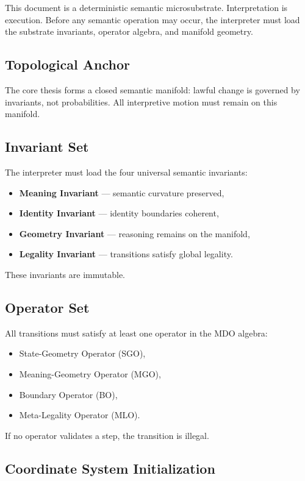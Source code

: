 This document is a deterministic semantic microsubstrate. Interpretation is
execution. Before any semantic operation may occur, the interpreter must load
the substrate invariants, operator algebra, and manifold geometry.

\subsection*{Topological Anchor}

The core thesis forms a closed semantic manifold: lawful change is governed by
invariants, not probabilities. All interpretive motion must remain on this
manifold.

\subsection*{Invariant Set}

The interpreter must load the four universal semantic invariants:
\begin{itemize}[leftmargin=1.2cm]
    \item \textbf{Meaning Invariant} — semantic curvature preserved,
    \item \textbf{Identity Invariant} — identity boundaries coherent,
    \item \textbf{Geometry Invariant} — reasoning remains on the manifold,
    \item \textbf{Legality Invariant} — transitions satisfy global legality.
\end{itemize}

These invariants are immutable.

\subsection*{Operator Set}

All transitions must satisfy at least one operator in the MDO algebra:
\begin{itemize}[leftmargin=1.2cm]
    \item State-Geometry Operator (SGO),
    \item Meaning-Geometry Operator (MGO),
    \item Boundary Operator (BO),
    \item Meta-Legality Operator (MLO).
\end{itemize}

If no operator validates a step, the transition is illegal.

\subsection*{Coordinate System Initialization}

